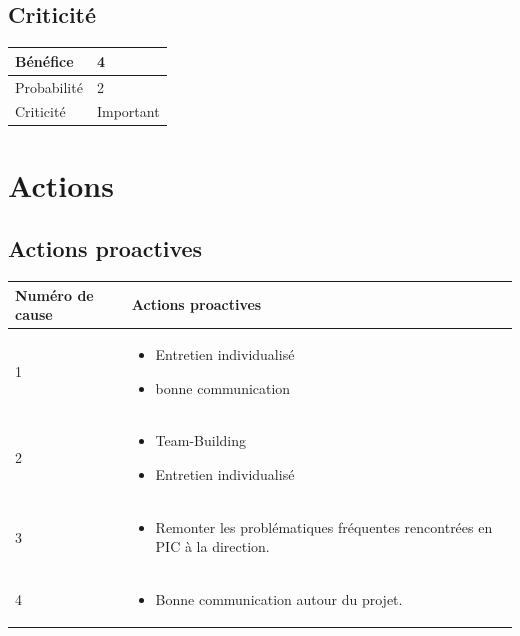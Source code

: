 \subsection*{Criticité}

\begin{table}[H]
\centering
	\begin{tabularx}{16.8cm}{|>{}X|X|}
	\hline
	Bénéfice & 4\\
	\hline
	Probabilité & 2 \\
	\hline
	Criticité & Important \\
	\hline
	\end{tabularx}
\end{table}

\newpage
\section*{Actions}
\subsection*{Actions proactives}

\centering
	\begin{longtable}{|p{7cm}|p{7cm}|}
	\hline
	Numéro de cause & Actions proactives \\
	
	\hline
	  1 &  \begin{itemize}
	  	\item Entretien individualisé
	  	\item bonne communication
	  	\end{itemize} \\
	  	
	  \hline
	  2 & \begin{itemize} 
	  \item Team-Building
	  \item Entretien individualisé
	  \end{itemize} \\
	  \hline
	  3 & \begin{itemize} 
	  \item Remonter les problématiques fréquentes rencontrées en PIC à la direction. 
	  \end{itemize} \\
	  \hline
	   4 & \begin{itemize}
	   \item Bonne communication autour du projet. 
	   \end{itemize} \\
	\hline
	
\end{longtable}